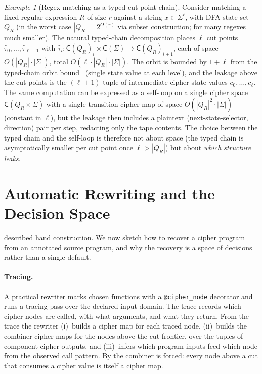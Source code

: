 \documentclass[11pt]{article}
\theoremstyle{definition}
\theoremstyle{plain}
\theoremstyle{remark}
\newtheorem{example}{Example}[section]
\newcommand{\cipher}[1]{\mathsf{C}(#1)}
\begin{document}
\begin{example}[Regex matching as a typed cut-point chain]
\label{ex:regex-cut-points}
Consider matching a fixed regular expression $R$ of size $r$ against a
string $x \in \Sigma^\ell$, with DFA state set $Q_R$ (in the worst
case $|Q_R| = 2^{O(r)}$ via subset construction; for many regexes
much smaller).
The natural typed-chain decomposition places $\ell$ cut points
$\hat{\tau}_0, \ldots, \hat{\tau}_{\ell-1}$ with $\hat{\tau}_i :
\cipher{Q_R}_i \times \cipher{\Sigma} \to \cipher{Q_R}_{i+1}$, each
of space $O(|Q_R| \cdot |\Sigma|)$, total
$O(\ell \cdot |Q_R| \cdot |\Sigma|)$.
The orbit is bounded by $1 + \ell$ from the typed-chain orbit bound~\cite{towell2026algebraic}
(single state value at each level), and the leakage above the cut
points is the $(\ell + 1)$-tuple of intermediate cipher state values
$c_0, \ldots, c_\ell$.
The same computation can be expressed as a self-loop on a single
cipher space $\cipher{Q_R \times \Sigma}$ with a single transition
cipher map of space $O(|Q_R|^2 \cdot |\Sigma|)$ (constant in $\ell$),
but the leakage then includes a plaintext (next-state-selector,
direction) pair per step, redacting only the tape contents.
The choice between the typed chain and the self-loop is therefore not
about space (the typed chain is asymptotically smaller per cut point
once $\ell > |Q_R|$) but about \emph{which structure leaks}.
\end{example}



\section{Automatic Rewriting and the Decision Space}
\label{sec:auto}

 described hand construction.
We now sketch how to recover a cipher program from an annotated source
program, and why the recovery is a space of decisions rather than a
single default.

\paragraph{Tracing.}
A practical rewriter marks chosen functions with a \texttt{@cipher\_node}
decorator and runs a tracing pass over the declared input domain.
The trace records which cipher nodes are called, with what arguments,
and what they return.
From the trace the rewriter (i)~builds a cipher map for each traced
node, (ii)~builds the combiner cipher maps for the nodes above the cut
frontier, over the tuples of component cipher outputs, and (iii)~infers
which program inputs feed which node from the observed call pattern.
By  the combiner is forced: every node
above a cut that consumes a cipher value is itself a cipher map.
\end{document}
